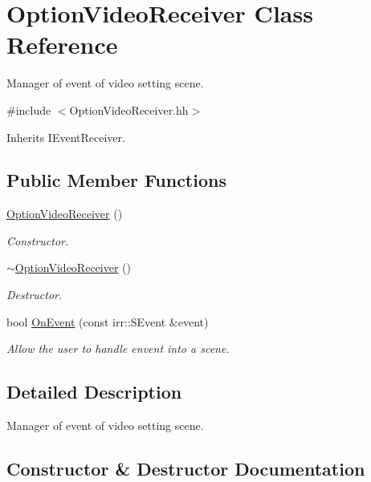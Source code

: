 \hypertarget{classOptionVideoReceiver}{}\section{Option\+Video\+Receiver Class Reference}
\label{classOptionVideoReceiver}


Manager of event of video setting scene.  




{\ttfamily \#include $<$Option\+Video\+Receiver.\+hh$>$}



Inherits I\+Event\+Receiver.

\subsection*{Public Member Functions}
\begin{DoxyCompactItemize}
\item 
\hyperlink{classOptionVideoReceiver_ac513ff2e3b42ab38dc47b07ece611a61}{Option\+Video\+Receiver} ()
\begin{DoxyCompactList}\small\item\em Constructor. \end{DoxyCompactList}\item 
\hyperlink{classOptionVideoReceiver_ab014b77305c68f220fa5a0c8e9e57cb9}{$\sim$\+Option\+Video\+Receiver} ()
\begin{DoxyCompactList}\small\item\em Destructor. \end{DoxyCompactList}\item 
bool \hyperlink{classOptionVideoReceiver_a203025900c489eb2df12a6b3471c3caa}{On\+Event} (const irr\+::\+S\+Event \&event)
\begin{DoxyCompactList}\small\item\em Allow the user to handle envent into a scene. \end{DoxyCompactList}\end{DoxyCompactItemize}


\subsection{Detailed Description}
Manager of event of video setting scene. 

\subsection{Constructor \& Destructor Documentation}
\mbox{\label{classOptionVideoReceiver_ac513ff2e3b42ab38dc47b07ece611a61}} 
